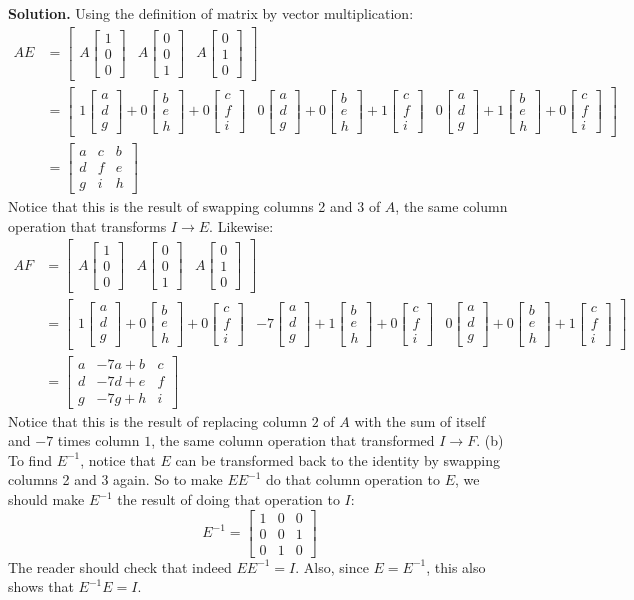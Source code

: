\documentclass[11pt, letterpaper]{report}
\newenvironment{book}{}{}
\newcommand{\bbbvec}[3]{
  \begin{bmatrix} #1 \\ #2 \\ #3 \end{bmatrix}
}
\begin{document}
\begin{book}
\textbf{Solution.} Using the definition of matrix by vector multiplication:
\begin{align*}
AE &= \begin{bmatrix}
A \bbbvec{1}{0}{0} & A \bbbvec{0}{0}{1} & A \bbbvec{0}{1}{0} 
\end{bmatrix} \\
&= \begin{bmatrix}
1 \bbbvec{a}{d}{g} + 0 \bbbvec{b}{e}{h} + 0 \bbbvec{c}{f}{i} &
0 \bbbvec{a}{d}{g} + 0 \bbbvec{b}{e}{h} + 1 \bbbvec{c}{f}{i} &
0 \bbbvec{a}{d}{g} + 1 \bbbvec{b}{e}{h} + 0 \bbbvec{c}{f}{i} 
\end{bmatrix} \\
&= \begin{bmatrix}
a & c & b \\
d & f & e \\
g & i & h
\end{bmatrix}
\end{align*}
Notice that this is the result of swapping columns 2 and 3 of $A$, the same column operation that transforms $I \rightarrow E$. Likewise:
\begin{align*}
AF &= \begin{bmatrix}
A \bbbvec{1}{0}{0} & A \bbbvec{0}{0}{1} & A \bbbvec{0}{1}{0} 
\end{bmatrix} \\
&= \begin{bmatrix}
1 \bbbvec{a}{d}{g} + 0 \bbbvec{b}{e}{h} + 0 \bbbvec{c}{f}{i} &
-7 \bbbvec{a}{d}{g} + 1 \bbbvec{b}{e}{h} + 0 \bbbvec{c}{f}{i} &
0 \bbbvec{a}{d}{g} + 0 \bbbvec{b}{e}{h} + 1 \bbbvec{c}{f}{i} 
\end{bmatrix} \\
&= \begin{bmatrix}
a & -7a + b & c \\
d & -7d + e & f \\
g & -7g + h & i
\end{bmatrix}
\end{align*}
Notice that this is the result of replacing column $2$ of $A$ with the sum of itself and $-7$ times column $1$, the same column operation that transformed $I \rightarrow F$.
(b) To find $E^{-1}$, notice that $E$ can be transformed back to the identity by swapping columns 2 and 3 again. So to make $EE^{-1}$ do that column operation to $E$, we should make $E^{-1}$ the result of doing that operation to $I$:
\[E^{-1} =  \begin{bmatrix}
1 & 0 & 0 \\
0 & 0 & 1 \\
0 & 1 & 0 
\end{bmatrix}\]
The reader should check that indeed $EE^{-1}=I$. Also, since $E = E^{-1}$, this also shows that $E^{-1}E = I$. \blacksquare
\end{book}
\end{document}

